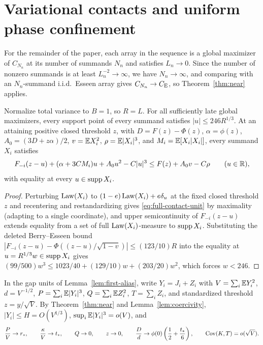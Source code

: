 \section{Variational contacts and uniform phase confinement}\label{sec:contacts}

For the remainder of the paper, each array in the sequence is a global
maximizer of $C_{N_n}$ at its number of summands $N_n$ and satisfies
$L_n\to0$. Since the number of nonzero summands is at least $L_n^{-2}\to\infty$,
we have $N_n\to\infty$, and comparing with an $N_n$-summand i.i.d.\ Esseen
array gives $C_{N_n}\to C_{\mathrm E}$, so Theorem~\ref{thm:near} applies.

\begin{lemma}\label{lem:coercivity}
Normalize total variance to $B=1$, so $R=L$. For all sufficiently late global
maximizers, every support point of every summand satisfies
$|u|\le246R^{1/3}$. At an attaining positive closed threshold $z$, with
$D=F(z)-\Phi(z)$, $\alpha=\phi(z)$, $A_0=(3D+z\alpha)/2$, $v=\mathbb E X_i^2$,
$\rho=\mathbb E|X_i|^3$, and $M_i=\mathbb E[X_i|X_i|]$, every summand $X_i$ satisfies
\begin{equation}\label{eq:full-contact-unit}
 F_{-i}(z-u)+(\alpha+3CM_i)u+A_0u^2-C|u|^3
       \le F(z)+A_0v-C\rho\qquad(u\in\mathbb R),
\end{equation}
with equality at every $u\in\operatorname{supp} X_i$.
\end{lemma}
\begin{proof}
Perturbing $\operatorname{Law}(X_i)$ to $(1-e)\operatorname{Law}(X_i)+e\delta_u$ at the fixed closed
threshold $z$ and recentering and restandardizing gives \eqref{eq:full-contact-unit}
by maximality (adapting \citet[Section~2.1, eqs.~(7)--(12)]{HeChengCurrent2026}
to a single coordinate), and upper semicontinuity of $F_{-i}(z-u)$ extends
equality from a set of full $\operatorname{Law}(X_i)$-measure to $\operatorname{supp} X_i$. Substituting
the deleted Berry--Esseen bound $|F_{-i}(z-u)-\Phi((z-u)/\sqrt{1-v})|\le(123/10)R$
\citep[Theorem~2.1]{ChenShao2001} into the equality at $u=R^{1/3}w\in\operatorname{supp} X_i$
gives $(99/500)w^3\le1023/40+(129/10)w+(203/20)w^2$, which forces $w<246$.
\end{proof}

In the gap units of Lemma~\ref{lem:first-alias}, write $Y_i=J_i+Z_i$ with
$V=\sum_i\mathbb E Y_i^2$, $d=V^{-1/2}$, $P=\sum_i\mathbb E|Y_i|^3$, $Q=\sum_i\mathbb E Z_i^2$,
$T=\sum_i Z_i$, and standardized threshold $z=y/\sqrt V$. By
Theorem~\ref{thm:near} and Lemma~\ref{lem:coercivity}, $|Y_i|\le H=O(V^{1/3})$,
$\sup_i\mathbb E|Y_i|^3=o(V)$, and
\begin{equation}\label{eq:contact-inputs}
 \frac PV\to r_*,\qquad \frac\kappa V\to t_*,\qquad Q\to0,\qquad
 z\to0,\qquad \frac Dd\to\phi(0)\left(\frac12+\frac{t_*}6\right),\qquad
 \operatorname{Cov}(K,T)=o(\sqrt V).
\end{equation}

